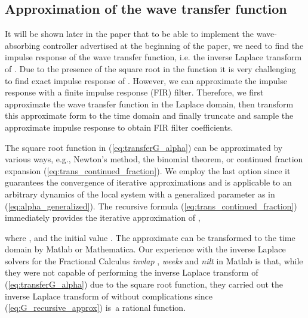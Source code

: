 \documentclass[final,5p,times,twocolumn]{elsarticle}
\begin{document}
\subsection{Approximation of the wave transfer function}
It will be shown later in the paper that to be able to implement the wave-absorbing controller advertised at the beginning of the paper, we need to find the impulse response of the wave transfer function, i.e. the inverse Laplace transform of . Due to the presence of the square root in the function it is very challenging to find exact impulse response of . However, we can approximate the impulse response with a finite impulse response (FIR) filter. Therefore, we first approximate the wave transfer function in the Laplace domain, then transform this approximate form to the time domain and finally truncate and sample the approximate impulse response to obtain FIR filter coefficients.

The square root function in (\ref{eq:transferG_alpha}) can be approximated by various ways, e.g., Newton's method, the binomial theorem, or continued fraction expansion (\ref{eq:trans_continued_fraction}). We employ the last option since it guarantees the convergence of iterative approximations and is applicable to an arbitrary dynamics of the local system with a generalized parameter  as in (\ref{eq:alpha_generalized}). The recursive formula (\ref{eq:trans_continued_fraction}) immediately provides the iterative approximation of ,

where , and the initial value . The approximate  can be transformed to the time domain by Matlab or Mathematica. Our experience with the inverse Laplace solvers for the Fractional Calculus \emph{invlap} \cite{dehoog1982}, \emph{weeks} \cite{Weeks1966} and \emph{nilt} \cite{brancik1999} in Matlab is that, while they were not capable of performing the inverse Laplace transform of (\ref{eq:transferG_alpha}) due to the square root function, they carried out the inverse Laplace transform of  without complications since (\ref{eq:G_recursive_approx}) is~a rational function.
\end{document}
